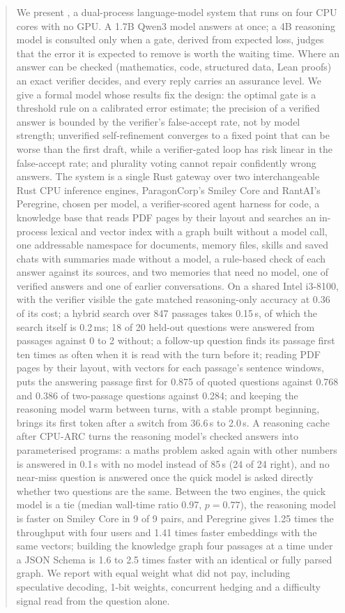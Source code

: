 \documentclass[journal]{IEEEtran}
\theoremstyle{plain}
\theoremstyle{definition}
\begin{document}
\begin{abstract}
We present \Sys, a dual-process language-model system that runs on four CPU cores with no GPU. A 1.7B Qwen3 model answers at once; a 4B reasoning model is consulted only when a gate, derived from expected loss, judges that the error it is expected to remove is worth the waiting time. Where an answer can be checked (mathematics, code, structured data, Lean proofs) an exact verifier decides, and every reply carries an assurance level. We give a formal model whose results fix the design: the optimal gate is a threshold rule on a calibrated error estimate; the precision of a verified answer is bounded by the verifier's false-accept rate, not by model strength; unverified self-refinement converges to a fixed point that can be worse than the first draft, while a verifier-gated loop has risk linear in the false-accept rate; and plurality voting cannot repair confidently wrong answers. The system is a single Rust gateway over two interchangeable Rust CPU inference engines, ParagonCorp's Smiley Core and RantAI's Peregrine, chosen per model, a verifier-scored agent harness for code, a knowledge base that reads PDF pages by their layout and searches an in-process lexical and vector index with a graph built without a model call, one addressable namespace for documents, memory files, skills and saved chats with summaries made without a model, a rule-based check of each answer against its sources, and two memories that need no model, one of verified answers and one of earlier conversations. On a shared Intel i3-8100, with the verifier visible the gate matched reasoning-only accuracy at 0.36 of its cost; a hybrid search over 847 passages takes 0.15\,s, of which the search itself is 0.2\,ms; 18 of 20 held-out questions were answered from passages against 0 to 2 without; a follow-up question finds its passage first ten times as often when it is read with the turn before it; reading PDF pages by their layout, with vectors for each passage's sentence windows, puts the answering passage first for 0.875 of quoted questions against 0.768 and 0.386 of two-passage questions against 0.284; and keeping the reasoning model warm between turns, with a stable prompt beginning, brings its first token after a switch from 36.6\,s to 2.0\,s. A reasoning cache after CPU-ARC turns the reasoning model's checked answers into parameterised programs: a maths problem asked again with other numbers is answered in 0.1\,s with no model instead of 85\,s (24 of 24 right), and no near-miss question is answered once the quick model is asked directly whether two questions are the same. Between the two engines, the quick model is a tie (median wall-time ratio 0.97, $p=0.77$), the reasoning model is faster on Smiley Core in 9 of 9 pairs, and Peregrine gives 1.25 times the throughput with four users and 1.41 times faster embeddings with the same vectors; building the knowledge graph four passages at a time under a JSON Schema is 1.6 to 2.5 times faster with an identical or fully parsed graph. We report with equal weight what did not pay, including speculative decoding, 1-bit weights, concurrent hedging and a difficulty signal read from the question alone.
\end{abstract}
\end{document}
